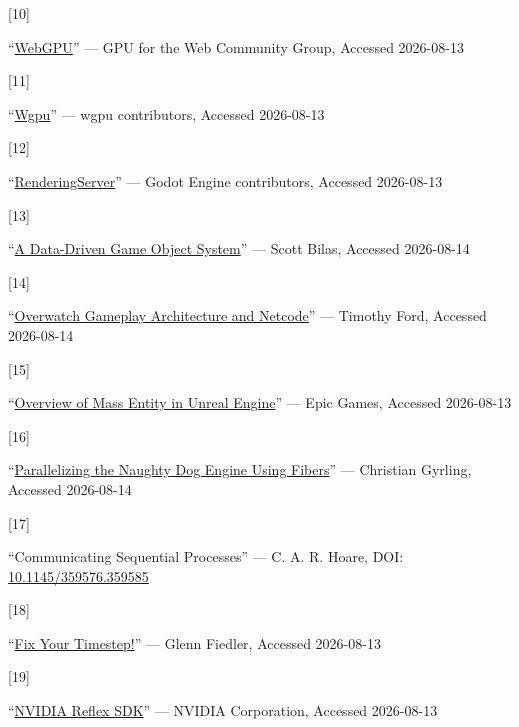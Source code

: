 \documentclass[
  11pt,
  letterpaper,
  DIV=11,
  numbers=noendperiod,
  twoside,
  open=right]{scrreprt}
\newlength{\cslhangindent}
\newlength{\csllabelwidth}
\newenvironment{CSLReferences}[2] %
 {\begin{list}{}{%
  \setlength{\itemindent}{0pt}
  \setlength{\leftmargin}{0pt}
  \setlength{\parsep}{0pt}
  \ifodd #1
   \setlength{\leftmargin}{\cslhangindent}
   \setlength{\itemindent}{-1\cslhangindent}
  \fi
  \setlength{\itemsep}{#2\baselineskip}}}
 {\end{list}}
\newcommand{\CSLLeftMargin}[1]{\parbox[t]{\csllabelwidth}{\strut#1\strut}}
\newcommand{\CSLRightInline}[1]{\parbox[t]{\linewidth - \csllabelwidth}{\strut#1\strut}}
\begin{document}
\begin{CSLReferences}{0}{1}
\CSLLeftMargin{{[}10{]} }%
\CSLRightInline{{``\href{https://www.w3.org/TR/webgpu/}{WebGPU}''} ---
GPU for the Web Community Group, Accessed 2026-08-13}

\CSLLeftMargin{{[}11{]} }%
\CSLRightInline{{``\href{https://wgpu.rs/}{Wgpu}''} --- {wgpu
contributors}, Accessed 2026-08-13}

\CSLLeftMargin{{[}12{]} }%
\CSLRightInline{{``\href{https://docs.godotengine.org/en/stable/classes/class_renderingserver.html}{RenderingServer}''}
--- Godot Engine contributors, Accessed 2026-08-13}

\CSLLeftMargin{{[}13{]} }%
\CSLRightInline{{``\href{https://www.gamedevs.org/uploads/data-driven-game-object-system.pdf}{{A
Data-Driven Game Object System}}''} --- Scott Bilas, Accessed
2026-08-14}

\CSLLeftMargin{{[}14{]} }%
\CSLRightInline{{``\href{https://www.youtube.com/watch?v=W3aieHjyNvw}{{Overwatch
Gameplay Architecture and Netcode}}''} --- Timothy Ford, Accessed
2026-08-14}

\CSLLeftMargin{{[}15{]} }%
\CSLRightInline{{``\href{https://dev.epicgames.com/documentation/en-us/unreal-engine/overview-of-mass-entity-in-unreal-engine}{{Overview
of Mass Entity in Unreal Engine}}''} --- Epic Games, Accessed
2026-08-13}

\CSLLeftMargin{{[}16{]} }%
\CSLRightInline{{``\href{https://www.gdcvault.com/play/1022186/Parallelizing-the-Naughty-Dog-Engine}{{Parallelizing
the Naughty Dog Engine Using Fibers}}''} --- Christian Gyrling, Accessed
2026-08-14}

\CSLLeftMargin{{[}17{]} }%
\CSLRightInline{{``{Communicating Sequential Processes}''} --- C. A. R.
Hoare, DOI:
\href{https://doi.org/10.1145/359576.359585}{10.1145/359576.359585}}

\CSLLeftMargin{{[}18{]} }%
\CSLRightInline{{``\href{https://gafferongames.com/post/fix_your_timestep/}{{Fix
Your Timestep!}}''} --- Glenn Fiedler, Accessed 2026-08-13}

\CSLLeftMargin{{[}19{]} }%
\CSLRightInline{{``\href{https://developer.nvidia.com/reflex}{{NVIDIA
Reflex SDK}}''} --- NVIDIA Corporation, Accessed 2026-08-13}

\end{CSLReferences}
\end{document}
